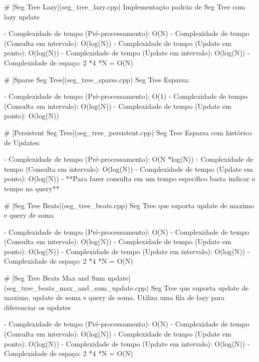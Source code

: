 \documentclass[11pt, a4paper, twoside]{article}
\begin{document}
\# [Seg Tree Lazy](seg\_tree\_lazy.cpp)
Implementação padrão de Seg Tree com lazy update

- Complexidade de tempo (Pré-processamento): O(N)
- Complexidade de tempo (Consulta em intervalo): O(log(N))
- Complexidade de tempo (Update em ponto): O(log(N))
- Complexidade de tempo (Update em intervalo): O(log(N))
- Complexidade de espaço: 2 *4 *N = O(N)

\# [Sparse Seg Tree](seg\_tree\_sparse.cpp)
Seg Tree Esparsa:

- Complexidade de tempo (Pré-processamento): O(1)
- Complexidade de tempo (Consulta em intervalo): O(log(N))
- Complexidade de tempo (Update em ponto): O(log(N))

\# [Persistent Seg Tree](seg\_tree\_persistent.cpp)
Seg Tree Esparsa com histórico de Updates:

- Complexidade de tempo (Pré-processamento): O(N *log(N))
- Complexidade de tempo (Consulta em intervalo): O(log(N))
- Complexidade de tempo (Update em ponto): O(log(N))
- **Para fazer consulta em um tempo específico basta indicar o tempo na query**

\# [Seg Tree Beats](seg\_tree\_beats.cpp)
Seg Tree que suporta update de maximo e query de soma

- Complexidade de tempo (Pré-processamento): O(N)
- Complexidade de tempo (Consulta em intervalo): O(log(N))
- Complexidade de tempo (Update em ponto): O(log(N))
- Complexidade de tempo (Update em intervalo): O(log(N))
- Complexidade de espaço: 2 *4 *N = O(N)

\# [Seg Tree Beats Max and Sum update](seg\_tree\_beats\_max\_and\_sum\_update.cpp)
Seg Tree que suporta update de maximo, update de soma e query de soma.
Utiliza uma fila de lazy para diferenciar os updates

- Complexidade de tempo (Pré-processamento): O(N)
- Complexidade de tempo (Consulta em intervalo): O(log(N))
- Complexidade de tempo (Update em ponto): O(log(N))
- Complexidade de tempo (Update em intervalo): O(log(N))
- Complexidade de espaço: 2 *4 *N = O(N)
\end{document}
